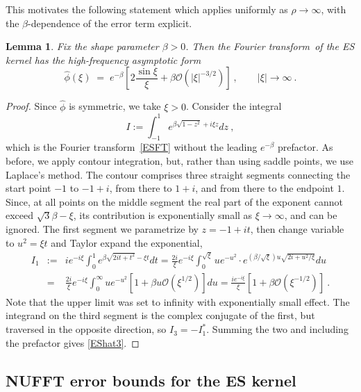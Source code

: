 \documentclass[10pt]{article}
\newcommand{\be}{\begin{equation}}
\newcommand{\ee}{\end{equation}}
\newcommand{\bea}{\begin{eqnarray}}
\newcommand{\eea}{\end{eqnarray}}
\newcommand{\bigO}{{\mathcal O}}
\newtheorem{lem}[thm]{Lemma}
\newcommand{\freq}{\beta}          %
\newcommand{\FT}{Fourier transform}
\begin{document}
This motivates the following statement which applies uniformly
as $\rho\to\infty$, with the $\beta$-dependence of the error term
explicit.

\begin{lem} %
  Fix the shape parameter $\freq>0$. Then the \FT\ of the ES kernel
  has the high-frequency asymptotic form
  \be
  \hat\phi(\xi) \;=\; e^{-\beta}\left[ 2\frac{\sin \xi}{\xi}
  + \freq \bigO(|\xi|^{-3/2}) \right]
  ~,\qquad |\xi|\to\infty~.
  \label{EShat3}
  \ee
\label{l:EShat3}
\end{lem}
\begin{proof}
  Since $\hat\phi$ is symmetric, we take $\xi>0$.
  Consider the integral
  $$
  I := \int_{-1}^1 e^{\freq \sqrt{1-z^2} + i\xi z} dz~,
  $$
  which is the \FT\ \eqref{ESFT} without the leading $e^{-\freq}$
  prefactor.
  As before, we apply contour integration,
  but, rather than using saddle points, we use Laplace's method.
  The contour comprises three straight segments connecting the start
  point $-1$ to $-1+i$, from there to $1+i$, and from there to the endpoint $1$.
  Since, at all points on the middle segment the real part of the exponent
  cannot exceed $\sqrt{3}\freq - \xi$, its contribution is exponentially
  small as $\xi\to\infty$, and can be ignored.
  The first segment we parametrize by $z=-1+it$,
  then change variable to $u^2 = \xi t$ and Taylor expand the exponential,
  \bea
  I_1 &:=& i e^{-i\xi} \int_{0}^1 e^{\freq \sqrt{2it + t^2} - \xi t} dt
  =\frac{2i}{\xi} e^{-i\xi}  \int_0^{\sqrt{\xi}} u e^{-u^2} \cdot
  e^{(\freq/\sqrt{\xi})u \sqrt{2i+u^2/\xi}} du
  \nonumber \\
  &=&
  \frac{2i}{\xi} e^{-i\xi} \int_0^\infty u e^{-u^2}
  \left[
    1 + \freq u \bigO(\xi^{1/2})
    \right] du
  = \frac{i e^{-i\xi}}{\xi} \left[ 1 + \freq \bigO(\xi^{-1/2}) \right]
  ~.
  \eea
  Note that the upper limit was set to infinity with exponentially small effect.
  The integrand on the third segment is the complex conjugate of the first,
  but traversed in the opposite direction, so $I_3 = -I_1^\ast$.
  Summing the two and including the prefactor gives \eqref{EShat3}.
\end{proof}



\subsection{NUFFT error bounds for the ES kernel}
\end{document}
